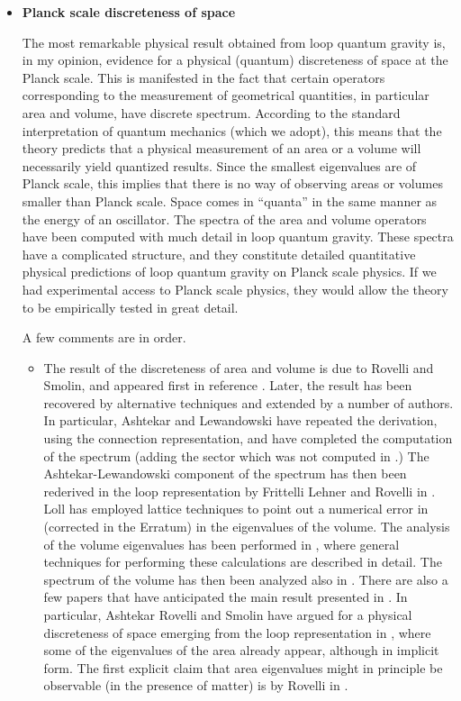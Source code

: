 \documentclass[12pt]{article}
\begin{document}
\begin{itemize}

\item {\bf Planck scale discreteness of space}

The most remarkable physical result obtained from loop quantum gravity 
is, in my opinion, evidence for a physical (quantum) discreteness of 
space at the Planck scale.  This is manifested in the fact that 
certain operators corresponding to the measurement of geometrical 
quantities, in particular area and volume, have discrete spectrum.  
According to the standard interpretation of quantum mechanics (which 
we adopt), this means that the theory predicts that a physical 
measurement of an area or a volume will necessarily yield quantized 
results.  Since the smallest eigenvalues are of Planck scale, this 
implies that there is no way of observing areas or volumes smaller 
than Planck scale.  Space comes in ``quanta'' in the same manner as 
the energy of an oscillator.  The spectra of the area and volume 
operators have been computed with much detail in loop quantum gravity.  
These spectra have a complicated structure, and they constitute 
detailed quantitative physical predictions of loop quantum gravity on 
Planck scale physics.  If we had experimental access to Planck scale 
physics, they would allow the theory to be empirically tested in great 
detail.

A few comments are in order.
\begin{itemize}

	\item The result of the discreteness of area and volume is due 
	to Rovelli and Smolin, and appeared first in reference 
	\cite{RovelliSmolin95}.  Later, the result has been recovered 
	by alternative techniques and extended by a number of authors.  
	In particular, Ashtekar and Lewandowski 
	\cite{AshtekarLewandowskiArea2} have repeated the derivation, 
	using the connection representation, and have completed the 
	computation of the spectrum (adding the sector which was not 
	computed in \cite{RovelliSmolin95}.)  The Ashtekar-Lewandowski 
	component of the spectrum has then been rederived in the loop 
	representation by Frittelli Lehner and Rovelli in 
	\cite{FrittelliEtAl}.  Loll has employed lattice techniques to 
	point out a numerical error in \cite{RovelliSmolin95} 
	(corrected in the Erratum) in the eigenvalues of the volume.  
	The analysis of the volume eigenvalues has been performed in 
	\cite{DePietriRovelli}, where general techniques for 
	performing these calculations are described in detail.  The 
	spectrum of the volume has then been analyzed also in 
	\cite{ThiemannVolume}.  There are also a few papers that have 
	anticipated the main result presented in 
	\cite{RovelliSmolin95}.  In particular, Ashtekar Rovelli and 
	Smolin have argued for a physical discreteness of space 
	emerging from the loop representation in \cite{weave}, where 
	some of the eigenvalues of the area already appear, although 
	in implicit form.  The first explicit claim that area 
	eigenvalues might in principle be observable (in the presence 
	of matter) is by Rovelli in \cite{RovelliArea}.


\end{itemize}
\end{itemize}
\end{document}
